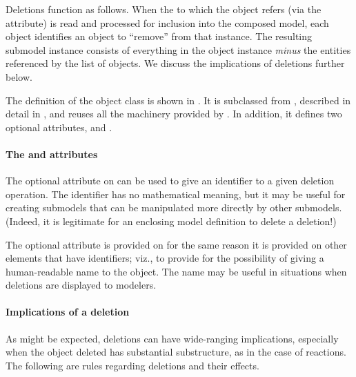 Deletions function as follows.  When the \Model to which the \Submodel
object refers (via the  attribute) is read and processed
for inclusion into the composed model, each \Deletion object identifies
an object to ``remove'' from that \Model instance.  The resulting
submodel instance consists of everything in the \Model object instance
\emph{minus} the entities referenced by the list of \Deletion objects.
We discuss the implications of deletions further below.

The definition of the \Deletion object class is shown in
.  It is subclassed from \SBaseRef, described in
detail in , and reuses all the machinery provided
by \SBaseRef.  In addition, it defines two optional attributes,
 and .


\paragraph{The \fixttspace{} and \fixttspace{} attributes}

The optional attribute  on \Deletion can be used to give an
identifier to a given deletion operation.  The identifier has no
mathematical meaning, but it may be useful for creating submodels that
can be manipulated more directly by other submodels.  (Indeed, it is
legitimate for an enclosing model definition to delete a deletion!)

The optional  attribute is provided on \Deletion for the
same reason it is provided on other elements that have identifiers;
viz., to provide for the possibility of giving a human-readable name to
the object.  The name may be useful in situations when deletions are
displayed to modelers.


\paragraph{Implications of a deletion}

As might be expected, deletions can have wide-ranging implications,
especially when the object deleted has substantial substructure, as in
the case of reactions.  The following are rules regarding deletions and
their effects.

